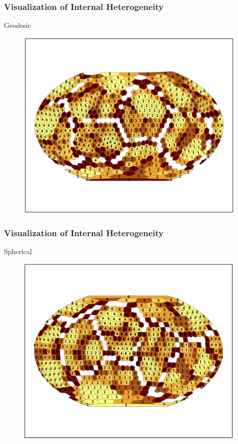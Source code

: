 \documentclass[nototal,handout]{beamer}
\begin{document}
\begin{frame}
	\frametitle{Visualization of Internal Heterogeneity}
 
\begin{block}{Geodesic}
  \begin{center}
  \begin{figure}
  \includegraphics[width=0.70\linewidth]{geodesic_clusters.png}
  \end{figure}
  \end{center}
 \end{block} \end{frame} 

\begin{frame}
	\frametitle{Visualization of Internal Heterogeneity}
 
\begin{block}{Spherical}
  \begin{center}
  \begin{figure}
  \includegraphics[width=0.70\linewidth]{sphere_clusters.png}
  \end{figure}
  \end{center}
 \end{block} \end{frame} 
\end{document}
